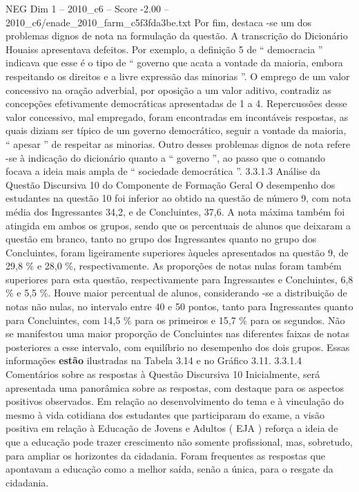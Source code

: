 \begin{textsample}{NEG Dim 1 – 2010\_c6 – Score -2.00 – 2010\_c6/enade\_2010\_farm\_c5f3fda3be.txt}
Por fim, destaca -se um dos problemas dignos de nota na formulação da questão.
A transcrição do Dicionário Houaiss apresentava defeitos.
Por exemplo, a definição 5 de “ democracia ” indicava que esse é o tipo de “ governo que acata a vontade da maioria, embora respeitando os direitos e a livre expressão das minorias ”.
O emprego de um valor concessivo na oração adverbial, por oposição a um valor aditivo, contradiz as concepções efetivamente democráticas apresentadas de 1 a 4.
Repercussões desse valor concessivo, mal empregado, foram encontradas em incontáveis respostas, as quais diziam ser típico de um governo democrático, seguir a vontade da maioria, “ apesar ” de respeitar as minorias.
Outro desses problemas dignos de nota refere -se à indicação do dicionário quanto a “ governo ”, ao passo que o comando focava a ideia mais ampla de “ sociedade democrática ”. 3.3.1.3 Análise da Questão Discursiva 10 do Componente de Formação Geral O desempenho dos estudantes na questão 10 foi inferior ao obtido na questão de número 9, com nota média dos Ingressantes 34,2, e de Concluintes, 37,6.
A nota máxima também foi atingida em ambos os grupos, sendo que os percentuais de alunos que deixaram a questão em branco, tanto no grupo dos Ingressantes quanto no grupo dos Concluintes, foram ligeiramente superiores àqueles apresentados na questão 9, de 29,8 \% e 28,0 \%, respectivamente.
As proporções de notas nulas foram também superiores para esta questão, respectivamente para Ingressantes e Concluintes, 6,8 \% e 5,5 \%.
Houve maior percentual de alunos, considerando -se a distribuição de notas não nulas, no intervalo entre 40 e 50 pontos, tanto para Ingressantes quanto para Concluintes, com 14,5 \% para os primeiros e 15,7 \% para os segundos.
Não se manifestou uma maior proporção de Concluintes nas diferentes faixas de notas posteriores a esse intervalo, com equilíbrio no desempenho dos dois grupos.
Essas informações \textbf{estão} ilustradas na Tabela 3.14 e no Gráfico 3.11. 3.3.1.4 Comentários sobre as respostas à Questão Discursiva 10 Inicialmente, será apresentada uma panorâmica sobre as respostas, com destaque para os aspectos positivos observados.
Em relação ao desenvolvimento do tema e à vinculação do mesmo à vida cotidiana dos estudantes que participaram do exame, a visão positiva em relação à Educação de Jovens e Adultos ( EJA ) reforça a ideia de que a educação pode trazer crescimento não somente profissional, mas, sobretudo, para ampliar os horizontes da cidadania.
Foram frequentes as respostas que apontavam a educação como a melhor saída, senão a única, para o resgate da cidadania.

\end{textsample}
